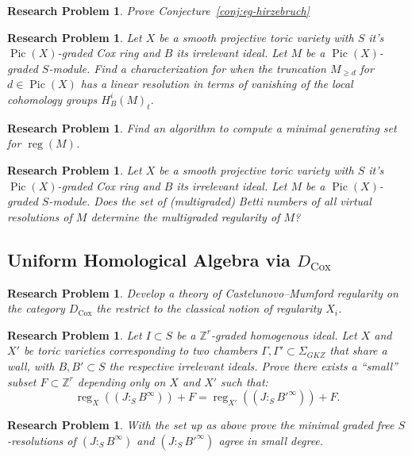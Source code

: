 \documentclass[11pt,reqno]{amsart}
\newtheorem{problem}[lemma]{Research Problem}
\theoremstyle{remark}
\newcommand{\reg}{\operatorname{reg}}
\newcommand{\Pic}{\operatorname{Pic}}
\newcommand{\Cox}{\operatorname{Cox}}
\newcommand{\ZZ}{\mathbb{Z}}
\begin{document}
\begin{problem}
	Prove Conjecture~\ref{conj:eg-hirzebruch}
\end{problem}
 
 \begin{problem}
 	Let $X$ be a smooth projective toric variety with $S$ it's $\Pic(X)$-graded Cox ring and $B$ its irrelevant ideal. Let $M$ be a $\Pic(X)$-graded $S$-module.  Find a characterization for when the truncation $M_{\geq d}$ for $d\in \Pic(X)$ has a linear resolution in terms of vanishing of the local cohomology groups $H^i_{B}(M)_{t}$. 
\end{problem}

\begin{problem}
	Find an algorithm to compute a minimal generating set for $\reg(M)$. 
\end{problem}

\begin{problem}
	Let $X$ be a smooth projective toric variety with $S$ it's $\Pic(X)$-graded Cox ring and $B$ its irrelevant ideal. Let $M$ be a $\Pic(X)$-graded $S$-module. Does the set of (multigraded) Betti numbers of all virtual resolutions of $M$ determine the multigraded regularity of $M$? 
\end{problem}


 \subsection{Uniform Homological Algebra via $D_{\Cox}$}
 
 
 \begin{problem}
 	Develop a theory of Castelunovo--Mumford regularity on the category $D_{\Cox}$ the restrict to the classical notion of regularity $X_{i}$. 
 \end{problem}
 
 \begin{problem}
 	Let $I \subset S$ be a $\ZZ^r$-graded homogenous ideal. Let $X$ and $X'$ be toric varieties corresponding to two chambers $\Gamma, \Gamma' \subset \Sigma_{GKZ}$ that share a wall, with $B,B' \subset S$ the respective irrelevant ideals. Prove there exists a ``small'' subset $F \subset \ZZ^r$ depending only on $X$ and $X'$ such that:
	\[
	\reg_{X}\left((J :_{S} B^{\infty})\right)+F =\reg_{X'}\left((J :_{S} B'^{\infty})\right)+F.
	\]
 \end{problem}
 
\begin{problem}
	With the set up as above prove the minimal graded free $S$-resolutions of $(J :_{S} B^{\infty})$ and $(J :_{S} B'^{\infty})$ agree in small degree. 
\end{problem}
 
\end{document}
